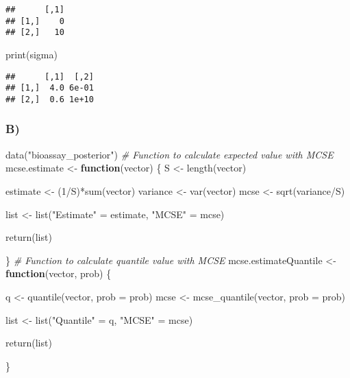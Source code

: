 \documentclass[
]{article}
\newenvironment{Shaded}{\begin{snugshade}}{\end{snugshade}}
\newcommand{\AttributeTok}[1]{\textcolor[rgb]{0.77,0.63,0.00}{#1}}
\newcommand{\CommentTok}[1]{\textcolor[rgb]{0.56,0.35,0.01}{\textit{#1}}}
\newcommand{\ControlFlowTok}[1]{\textcolor[rgb]{0.13,0.29,0.53}{\textbf{#1}}}
\newcommand{\DecValTok}[1]{\textcolor[rgb]{0.00,0.00,0.81}{#1}}
\newcommand{\FunctionTok}[1]{\textcolor[rgb]{0.00,0.00,0.00}{#1}}
\newcommand{\NormalTok}[1]{#1}
\newcommand{\OtherTok}[1]{\textcolor[rgb]{0.56,0.35,0.01}{#1}}
\newcommand{\SpecialCharTok}[1]{\textcolor[rgb]{0.00,0.00,0.00}{#1}}
\newcommand{\StringTok}[1]{\textcolor[rgb]{0.31,0.60,0.02}{#1}}
\begin{document}
\begin{verbatim}
##      [,1]
## [1,]    0
## [2,]   10
\end{verbatim}

\begin{Shaded}
\begin{Highlighting}[]
\FunctionTok{print}\NormalTok{(sigma)}
\end{Highlighting}
\end{Shaded}

\begin{verbatim}
##      [,1]  [,2]
## [1,]  4.0 6e-01
## [2,]  0.6 1e+10
\end{verbatim}

\hypertarget{b}{%
\subsubsection{B)}\label{b}}

\begin{Shaded}
\begin{Highlighting}[]
\FunctionTok{data}\NormalTok{(}\StringTok{"bioassay\_posterior"}\NormalTok{)}
\CommentTok{\# Function to calculate expected value with MCSE}
\NormalTok{mcse.estimate }\OtherTok{\textless{}{-}} \ControlFlowTok{function}\NormalTok{(vector) \{}
\NormalTok{  S }\OtherTok{\textless{}{-}} \FunctionTok{length}\NormalTok{(vector)}
  
\NormalTok{  estimate }\OtherTok{\textless{}{-}}\NormalTok{ (}\DecValTok{1}\SpecialCharTok{/}\NormalTok{S)}\SpecialCharTok{*}\FunctionTok{sum}\NormalTok{(vector)}
\NormalTok{  variance }\OtherTok{\textless{}{-}} \FunctionTok{var}\NormalTok{(vector)}
\NormalTok{  mcse }\OtherTok{\textless{}{-}} \FunctionTok{sqrt}\NormalTok{(variance}\SpecialCharTok{/}\NormalTok{S)}
  
\NormalTok{  list }\OtherTok{\textless{}{-}} \FunctionTok{list}\NormalTok{(}\StringTok{"Estimate"} \OtherTok{=}\NormalTok{  estimate, }
               \StringTok{"MCSE"}     \OtherTok{=}\NormalTok{ mcse)}
  
  \FunctionTok{return}\NormalTok{(list)}
  
\NormalTok{\}}
\CommentTok{\# Function to calculate quantile value with MCSE}
\NormalTok{mcse.estimateQuantile }\OtherTok{\textless{}{-}} \ControlFlowTok{function}\NormalTok{(vector, prob) \{}
  
\NormalTok{  q    }\OtherTok{\textless{}{-}} \FunctionTok{quantile}\NormalTok{(vector, }\AttributeTok{prob =}\NormalTok{ prob)}
\NormalTok{  mcse }\OtherTok{\textless{}{-}} \FunctionTok{mcse\_quantile}\NormalTok{(vector, }\AttributeTok{prob =}\NormalTok{ prob)}
  
\NormalTok{  list }\OtherTok{\textless{}{-}} \FunctionTok{list}\NormalTok{(}\StringTok{"Quantile"} \OtherTok{=}\NormalTok{ q,}
               \StringTok{"MCSE"}     \OtherTok{=}\NormalTok{ mcse)}
  
  \FunctionTok{return}\NormalTok{(list)}
  
\NormalTok{\}}
\end{Highlighting}
\end{Shaded}
\end{document}

